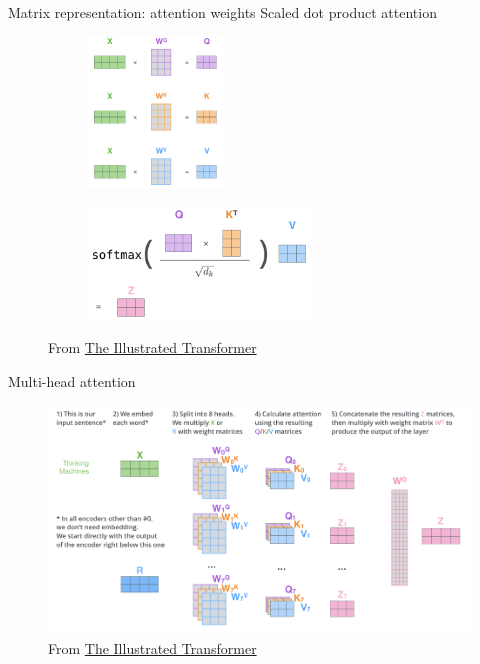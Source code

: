 \documentclass[usenames,dvipsnames,notes,11pt,aspectratio=169,hyperref={colorlinks=true, linkcolor=blue}]{beamer}
\begin{document}
\begin{frame}
    {Matrix representation: attention weights}
    Scaled dot product attention
    \begin{figure}
        \begin{subfigure}{.4\textwidth}
        \includegraphics[height=4cm]{figures/scaled-attn}
        \end{subfigure}
        \begin{subfigure}{.5\textwidth}
        \includegraphics[height=3cm]{figures/scaled-attn-2}
        \end{subfigure}
        \caption{From \href{https://jalammar.github.io/illustrated-transformer}{The Illustrated Transformer}}
    \end{figure}
\end{frame}

\begin{frame}
    {Multi-head attention}
    \begin{figure}
        \includegraphics[width=.9\textwidth]{figures/multi-head-matrix}
        \caption{From \href{https://jalammar.github.io/illustrated-transformer}{The Illustrated Transformer}}
    \end{figure}
\end{frame}
\end{document}
